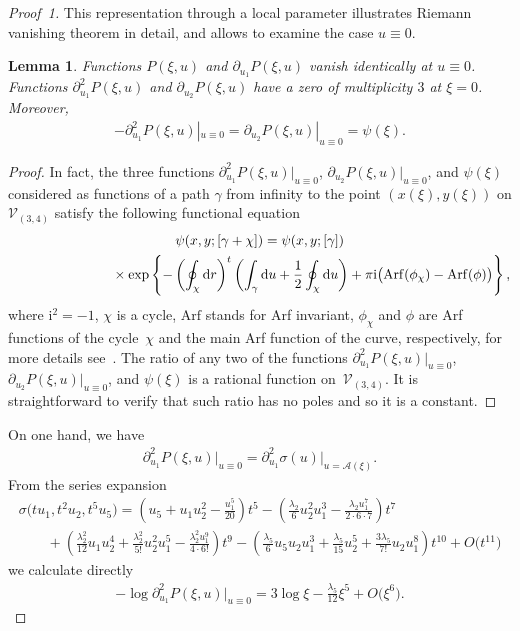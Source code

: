 \documentclass[11pt]{article}
\numberwithin{equation}{section}
\newtheorem{Lemma}[Theorem]{Lemma}
\newcommand{\rmd}{\mathrm{d}}
\newcommand{\rmi}{\mathrm{i}}
\newcommand{\Arf}{\mathrm{Arf}}
\begin{document}
\begin{proof}[Proof~1]
This representation through a local parameter illustrates Riemann vanishing theorem in detail, and allows to examine the case $u\equiv 0$.
\begin{Lemma}\label{L:PsiC34}
Functions $P(\xi,u)$ and $\partial_{u_1} P(\xi,u)$ vanish identically at $u\equiv 0$. Functions $\partial^2_{u_1} P(\xi,u)$ and $\partial_{u_2} P(\xi,u)$ have a zero of multiplicity $3$ at $\xi=0$. Moreover,
\begin{gather*}
 -\partial^2_{u_1} P(\xi,u)|_{u\equiv 0} = \partial_{u_2} P(\xi,u)|_{u\equiv 0} = \psi(\xi).
\end{gather*}
\end{Lemma}
\begin{proof} In fact, the three functions $\partial^2_{u_1} P(\xi,u)|_{u\equiv 0}$, $\partial_{u_2} P(\xi,u)|_{u\equiv 0}$, and $\psi(\xi)$ considered as functions of a path $\gamma$ from infinity to the point $(x(\xi),y(\xi))$ on $\mathcal{V}_{(3,4)}$ satisfy the following functional equation
\begin{gather}
 \psi(x,y;[\gamma + \chi]) = \psi(x,y;[\gamma]) \nonumber\\
 \hphantom{\psi(x,y;[\gamma + \chi]) =}{}\times \exp \left\{ - \left(\oint_{\chi} \rmd r \right)^t
 \left(\int_{\gamma} \rmd u + \frac{1}{2}\oint_{\chi} \rmd u\right) + \pi \rmi \big(\Arf(\phi_\chi) - \Arf(\phi) \big)\right\},\label{PsiFEq}
\end{gather}
where $\rmi^2=-1$, $\chi$ is a cycle, $\Arf$ stands for Arf invariant, $\phi_\chi$ and $\phi$ are Arf functions of the cycle~$\chi$ and the main Arf function of the curve, respectively, for more details see~\cite{BL2005}. The ratio of any two of the functions $\partial^2_{u_1} P(\xi,u)|_{u\equiv 0}$, $\partial_{u_2} P(\xi,u)|_{u\equiv 0}$, and $\psi(\xi)$ is a rational function on~$\mathcal{V}_{(3,4)}$. It is straightforward to verify that such ratio has no poles and so it is a constant.
\end{proof}

On one hand, we have
\begin{gather*}
 \partial^2_{u_1} P(\xi,u) \big|_{u\equiv 0} = \partial^2_{u_1} \sigma (u) \big|_{u = \mathcal{A}(\xi)}.
\end{gather*}
From the series expansion
\begin{gather}
 \sigma\big(t u_1,t^2 u_2,t^5 u_5\big) = \left(u_5 + u_1 u_2^2 - \frac{u_1^5}{20} \right)t^5 -
 \left(\frac{\lambda_2}{6} u_2^2 u_1^3 - \frac{\lambda_2 u_1^7}{2\cdot 6\cdot 7}\right)t^7 \label{C34Sigma}\\
 \qquad{} + \left(\frac{\lambda_2^2}{12} u_1 u_2^4 + \frac{\lambda_2^2}{5!} u_2^2 u_1^5
 - \frac{\lambda_2^2 u_1^9}{4\cdot 6!} \right) t^9
 - \left(\frac{\lambda_5}{6} u_5 u_2 u_1^3 + \frac{\lambda_5}{15} u_2^5 +
 \frac{3\lambda_5}{7!}u_2 u_1^8 \right)t^{10} + O\big(t^{11}\big)\nonumber
\end{gather}
we calculate directly
\begin{gather}\label{C34Psisigma}
 -\log \partial^2_{u_1} P(\xi,u) \big|_{u\equiv 0} = 3\log \xi - \frac{\lambda_5}{12} \xi^5 + O\big(\xi^6\big).
\end{gather}


\end{proof}
\end{document}
